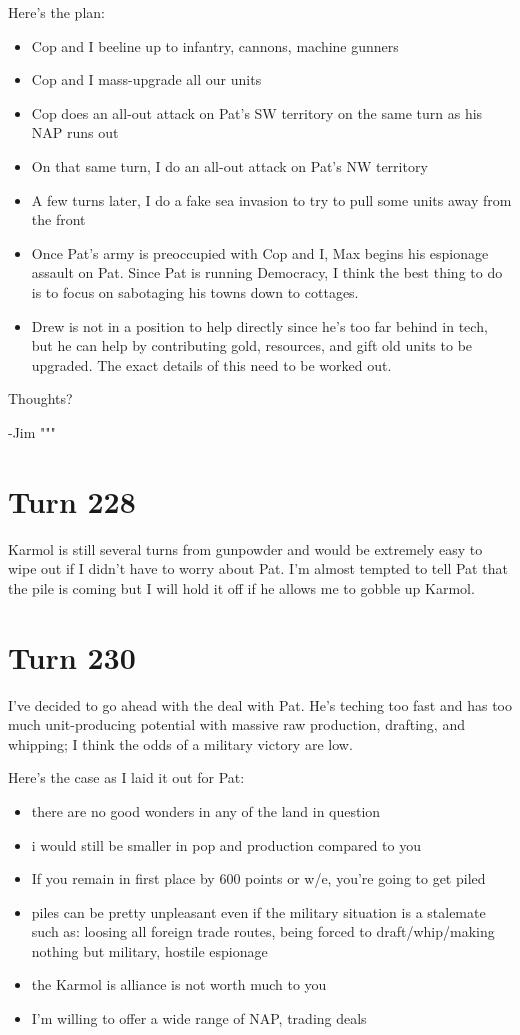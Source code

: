 \documentclass[10pt]{article}
\begin{document}
Here's the plan:
\begin{itemize}
\item Cop and I beeline up to infantry, cannons, machine gunners
\item Cop and I mass-upgrade all our units
\item Cop does an all-out attack on Pat's SW territory on the same turn as his NAP runs out
\item On that same turn, I do an all-out attack on Pat's NW territory
\item A few turns later, I do a fake sea invasion to try to pull some units away from the front
\item Once Pat's army is preoccupied with Cop and I, Max begins his espionage assault on Pat. Since Pat is running Democracy, I think the best thing to do is to focus on sabotaging his towns down to cottages.
\item Drew is not in a position to help directly since he's too far behind in tech, but he can help by contributing gold, resources, and gift old units to be upgraded. The exact details of this need to be worked out.
\end{itemize}

Thoughts?

-Jim
"""

\section*{Turn 228}

Karmol is still several turns from gunpowder and would be extremely easy to wipe out if I didn't have to worry about Pat. I'm almost tempted to tell Pat that the pile is coming but I will hold it off if he allows me to gobble up Karmol.

\section*{Turn 230}

I've decided to go ahead with the deal with Pat. He's teching too fast
and has too much unit-producing potential with massive raw production,
drafting, and whipping; I think the odds of a military victory are
low.

Here's the case as I laid it out for Pat:
\begin{itemize}
\item there are no good wonders in any of the land in question
\item i would still be smaller in pop and production compared to you
\item If you remain in first place by 600 points or w/e, you're going to get piled
\item piles can be pretty unpleasant even if the military situation is a stalemate
 such as: loosing all foreign trade routes, being forced to draft/whip/making nothing but military, hostile espionage
\item the Karmol is alliance is not worth much to you
\item I'm willing to offer a wide range of NAP, trading deals
\end{itemize}
\end{document}
